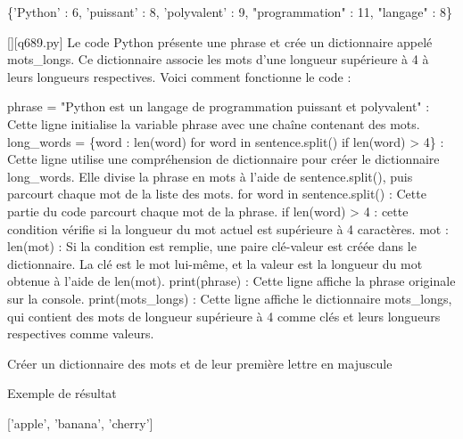 \{'Python' : 6, 'puissant' : 8, 'polyvalent' : 9, "programmation" : 11, "langage" : 8\}
        \par
        \begin{solution}
            \renewcommand{\nomfichier}{q689.py}
            \pythonfile{\chemincode \nomfichier}[][\nomfichier]
            Le code Python présente une phrase et crée un dictionnaire appelé mots\_longs. Ce dictionnaire associe les mots d'une longueur supérieure à 4 à leurs longueurs respectives. Voici comment fonctionne le code :

    phrase = "Python est un langage de programmation puissant et polyvalent" : Cette ligne initialise la variable phrase avec une chaîne contenant des mots.
    long\_words = \{word : len(word) for word in sentence.split() if len(word) > 4\} : Cette ligne utilise une compréhension de dictionnaire pour créer le dictionnaire long\_words. Elle divise la phrase en mots à l'aide de sentence.split(), puis parcourt chaque mot de la liste des mots.
        for word in sentence.split() : Cette partie du code parcourt chaque mot de la phrase.
        if len(word) > 4 : cette condition vérifie si la longueur du mot actuel est supérieure à 4 caractères.
        {mot : len(mot)} : Si la condition est remplie, une paire clé-valeur est créée dans le dictionnaire. La clé est le mot lui-même, et la valeur est la longueur du mot obtenue à l'aide de len(mot).
    print(phrase) : Cette ligne affiche la phrase originale sur la console.
    print(mots\_longs) : Cette ligne affiche le dictionnaire mots\_longs, qui contient des mots de longueur supérieure à 4 comme clés et leurs longueurs respectives comme valeurs.
        \end{solution}
        

        \question
        Créer un dictionnaire des mots et de leur première lettre en majuscule

Exemple de résultat

['apple', 'banana', 'cherry']

